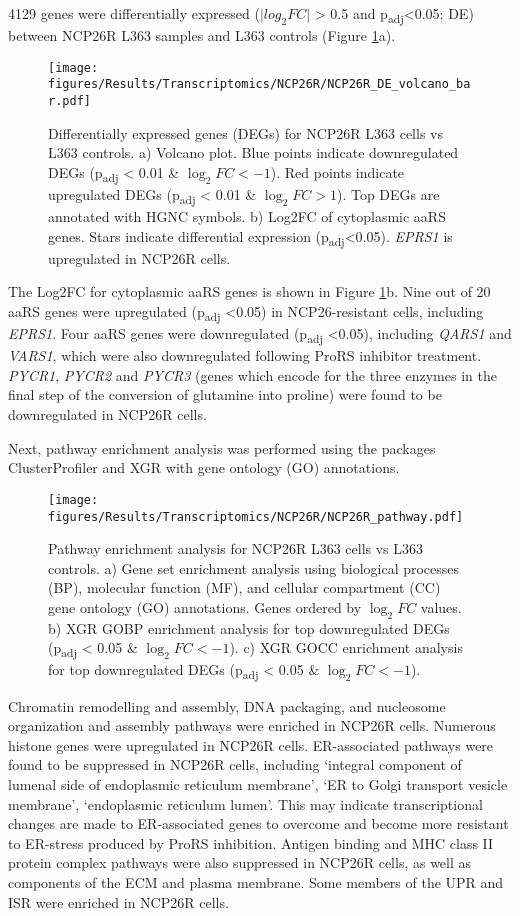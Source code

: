 4129 genes were differentially expressed ($\lvert log_{2}FC \rvert$ > 0.5 and p\textsubscript{adj}<0.05; DE) between NCP26R L363 samples and L363 controls (Figure \ref{fig:NCP26R_DE}a).
\begin{figure}[htb]
\centering
\texttt{[image: figures/Results/Transcriptomics/NCP26R/NCP26R\_DE\_volcano\_bar.pdf]}
\caption[NCP26R bulk RNA-seq differentially expression]{Differentially expressed genes (DEGs) for NCP26R L363 cells vs L363 controls.
a) Volcano plot. Blue points indicate downregulated DEGs (p\textsubscript{adj} < 0.01 \& $\log_{2}FC < -1$).
Red points indicate upregulated DEGs (p\textsubscript{adj} < 0.01 \& $\log_{2}FC > 1$).
Top DEGs are annotated with HGNC symbols.
b) Log2FC of cytoplasmic aaRS genes.
Stars indicate differential expression (p\textsubscript{adj}<0.05).
\textit{EPRS1} is upregulated in NCP26R cells.
}
\label{fig:NCP26R_DE}
\end{figure}
The Log2FC for cytoplasmic aaRS genes is shown in Figure \ref{fig:NCP26R_DE}b.
Nine out of 20 aaRS genes were upregulated (p\textsubscript{adj} <0.05) in NCP26-resistant cells, including \textit{EPRS1}.
Four aaRS genes were downregulated (p\textsubscript{adj} <0.05), including \textit{QARS1} and \textit{VARS1}, which were also downregulated following ProRS inhibitor treatment.
\textit{PYCR1}, \textit{PYCR2} and \textit{PYCR3} (genes which encode for the three enzymes in the final step of the conversion of glutamine into proline) were found to be downregulated in NCP26R cells.

Next, pathway enrichment analysis was performed using the packages ClusterProfiler and XGR with gene ontology (GO) annotations.
\begin{figure}[htb]
\centering
\texttt{[image: figures/Results/Transcriptomics/NCP26R/NCP26R\_pathway.pdf]}
\caption[NCP26R bulk RNA-seq pathway enrichment]{Pathway enrichment analysis for NCP26R L363 cells vs L363 controls.
a) Gene set enrichment analysis using biological processes (BP), molecular function (MF), and cellular compartment (CC) gene ontology (GO) annotations. Genes ordered by $\log_{2}FC$ values.
b) XGR GOBP enrichment analysis for top downregulated DEGs (p\textsubscript{adj} < 0.05 \& $\log_{2}FC < -1$).
c) XGR GOCC enrichment analysis for top downregulated DEGs (p\textsubscript{adj} < 0.05 \& $\log_{2}FC < -1$).
}
\label{fig:NCP26R_pathway}
\end{figure}
Chromatin remodelling and assembly, DNA packaging, and nucleosome organization and assembly pathways were enriched in NCP26R cells.
Numerous histone genes were upregulated in NCP26R cells.
ER-associated pathways were found to be suppressed in NCP26R cells, including `integral component of lumenal side of endoplasmic reticulum membrane', `ER to Golgi transport vesicle membrane', `endoplasmic reticulum lumen'.
This may indicate transcriptional changes are made to ER-associated genes to overcome and become more resistant to ER-stress produced by ProRS inhibition.
Antigen binding and MHC class II protein complex pathways were also suppressed in NCP26R cells, as well as components of the ECM and plasma membrane.
Some members of the UPR and ISR were enriched in NCP26R cells.

